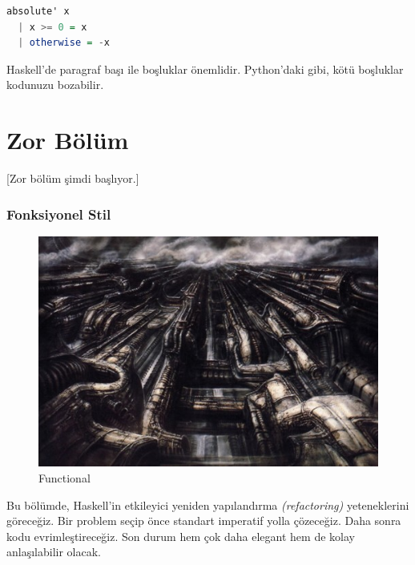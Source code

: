 \documentclass[a4paper,14pt,openany]{extbook} %
\let\emph\textit
\begin{document}
\begin{lstlisting}[language=Haskell]
  absolute' x
  | x >= 0 = x
  | otherwise = -x
\end{lstlisting}

Haskell'de paragraf başı ile boşluklar önemlidir. Python'daki gibi, kötü boşluklar kodunuzu bozabilir.

\part{Zor Bölüm}[Zor bölüm şimdi başlıyor.]\label{zor-kux131sux131m}

\section{Fonksiyonel Stil}\label{fonksiyonel-stil}

\begin{figure}[htbp]
  \centering
  \includegraphics{img/hr_giger_biomechanical_landscape_500.jpg}
  \caption{Functional}
\end{figure}

Bu bölümde, Haskell'in etkileyici yeniden yapılandırma
\emph{(refactoring)} yeteneklerini göreceğiz. Bir problem seçip önce
standart imperatif yolla çözeceğiz. Daha sonra kodu evrimleştireceğiz. 
Son durum hem çok daha elegant %
hem de kolay anlaşılabilir olacak.

\end{document}
